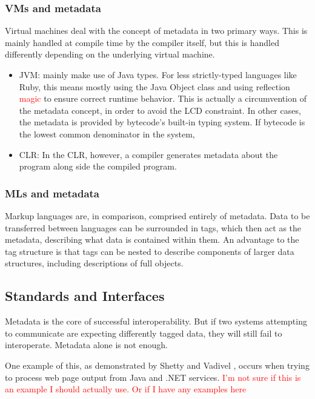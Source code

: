 \documentclass{sig-alternate}
\newcommand{\mycomment}[1]{\textcolor{red}{#1}}
\begin{document}
\subsubsection*{VMs and metadata}
Virtual machines deal with the concept of metadata in two primary ways. This is mainly handled at compile time by the compiler itself, but this is handled differently depending on the underlying virtual machine.
\begin{itemize}
\item JVM: mainly make use of Java types. For less strictly-typed languages like Ruby, this means mostly using the Java Object class and using reflection \mycomment{magic} to ensure correct runtime behavior. This is actually a circumvention of the metadata concept, in order to avoid the LCD constraint. In other cases, the metadata is provided by bytecode's built-in typing system. If bytecode is the lowest common denominator in the system, 
\item CLR: In the CLR, however, a compiler generates metadata about the program along side the compiled program\cite{Hamilton:2003}.
\end{itemize}

\subsubsection*{MLs and metadata}
Markup languages are, in comparison, comprised entirely of metadata. Data to be transferred between languages can be surrounded in tags, which then act as the metadata, describing what data is contained within them. An advantage to the tag structure is that tags can be nested to describe components of larger data structures, including descriptions of full objects. 


\subsection{Standards and Interfaces}\label{standards} \cite{Shetty:2009}
Metadata is the core of successful interoperability. But if two systems attempting to communicate are expecting differently tagged data, they will still fail to interoperate. Metadata alone is not enough.

One example of this, as demonstrated by Shetty and Vadivel \cite{Shetty:2009}, occurs when trying to process web page output from Java and .NET services. \mycomment{I'm not sure if this is an example I should actually use. Or if I have any examples here}
\end{document}
